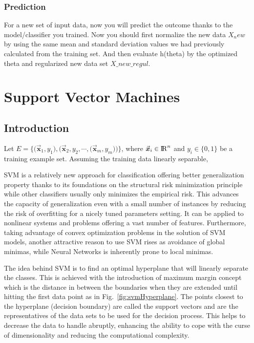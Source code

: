 \subsubsection{Prediction}

For a new set of input data, now you will predict the outcome thanks to the model/classifier you trained. Now you should first normalize the new data $X_new$ by using the same mean and standard deviation values we had previously calculated from the training set. And then evaluate h(theta) by the optimized theta and regularized new data set $X\_new\_regul$. 

\section{Support Vector Machines}

\subsection{Introduction}

Let $ E = \Big\{ \big( \vec{\bm{x}}_1, y_1 \big),\big( \vec{\bm{x}}_2, y_2, 
		\cdots, \big( \vec{\bm{x}}_m, y_m \big) \big) \Big\}$, 
		where $\vec{\bm{x}}_i \in {\rm I\!R}^n$ and $y_i \in \big\{0, 1\big\}$ 
		be a training example set. Assuming the training data linearly separable, 
		

SVM is a relatively new approach for classification offering better generalization property thanks to its foundations on the structural risk minimization principle \cite{gunn1998support,yin2014study} while other classifiers usually only minimizes the empirical risk. This advances the capacity of generalization even with a small number of instances by reducing the risk of overfitting for a nicely tuned parameters setting. It can be applied to nonlinear systems and problems offering a vast number of features. Furthermore, taking advantage of convex optimization problems in the solution of SVM models, another attractive reason to use SVM rises as avoidance of global minimas, while Neural Networks is inherently prone to local minimas.

The idea behind SVM is to find an optimal hyperplane that will linearly separate the classes. This is achieved with the introduction of maximum margin concept which is the distance in between the boundaries when they are extended until hitting the first data point as in Fig.~\ref{fig:svmHyperplane}. The points closest to the hyperplane (decision boundary) are called the support vectors and are the representatives of the data sets to be used for the decision process. This helps to decrease the data to handle abruptly, enhancing the ability to cope with the curse of dimensionality and reducing the computational complexity.

